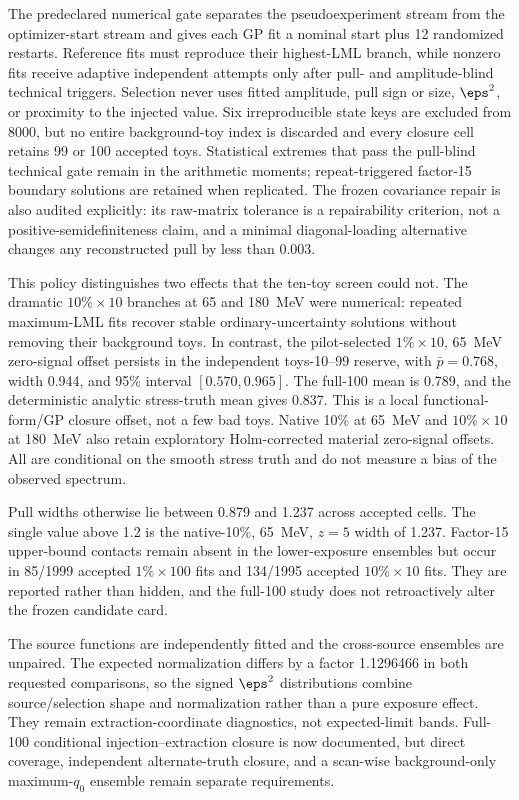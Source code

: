 The predeclared numerical gate separates the pseudoexperiment stream from the
optimizer-start stream and gives each GP fit a nominal start plus 12 randomized
restarts.  Reference fits must reproduce their highest-LML branch, while nonzero
fits receive adaptive independent attempts only after pull- and amplitude-blind
technical triggers.  Selection never uses fitted amplitude, pull sign or size,
$\eps^2$, or proximity to the injected value.  Six irreproducible state keys are
excluded from 8000, but no entire background-toy index is discarded and every closure
cell retains 99 or 100 accepted toys.  Statistical extremes that pass the pull-blind
technical gate remain in the arithmetic moments; repeat-triggered factor-15 boundary
solutions are retained when replicated.
The frozen covariance repair is also audited explicitly: its raw-matrix tolerance is
a repairability criterion, not a positive-semidefiniteness claim, and a minimal
diagonal-loading alternative changes any reconstructed pull by less than 0.003.

This policy distinguishes two effects that the ten-toy screen could not.  The
dramatic $10\%\times10$ branches at 65 and 180~MeV were numerical: repeated
maximum-LML fits recover stable ordinary-uncertainty solutions without removing
their background toys.  In contrast, the pilot-selected $1\%\times10$, 65~MeV
zero-signal offset persists in the independent toys-10--99 reserve, with
$\bar p=0.768$, width 0.944, and 95\% interval $[0.570,0.965]$.  The full-100
mean is 0.789, and the deterministic analytic stress-truth mean gives 0.837.
This is a local functional-form/GP closure offset, not a few bad toys.  Native
10\% at 65~MeV and $10\%\times10$ at 180~MeV also retain exploratory
Holm-corrected material zero-signal offsets.  All are conditional on the smooth
stress truth and do not measure a bias of the observed spectrum.

Pull widths otherwise lie between 0.879 and 1.237 across accepted cells.  The
single value above 1.2 is the native-10\%, 65~MeV, $z=5$ width of 1.237.
Factor-15 upper-bound contacts remain absent in the lower-exposure ensembles but
occur in 85/1999 accepted $1\%\times100$ fits and 134/1995 accepted
$10\%\times10$ fits.  They are reported rather than hidden, and the full-100
study does not retroactively alter the frozen candidate card.

The source functions are independently fitted and the cross-source ensembles are
unpaired.  The expected normalization differs by a factor 1.1296466 in both
requested comparisons, so the signed $\eps^2$ distributions combine
source/selection shape and normalization rather than a pure exposure effect.
They remain extraction-coordinate diagnostics, not expected-limit bands.
Full-100 conditional injection--extraction closure is now documented, but direct
\CLs{} coverage, independent alternate-truth closure, and a scan-wise
background-only maximum-$q_0$ ensemble remain separate requirements.

